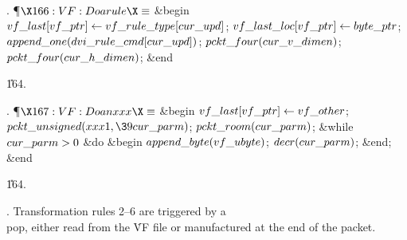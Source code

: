 . \P$\X166:VF: Do a \\{rule}\X\S$\6
\&{begin} $\\{vf\_last}[\\{vf\_ptr}]\gets\\{vf\_rule\_type}[\\{cur\_upd}]$;\5
$\\{vf\_last\_loc}[\\{vf\_ptr}]\gets\\{byte\_ptr}$;\5
$\\{append\_one}(\\{dvi\_rule\_cmd}[\\{cur\_upd}])$;\5
$\\{pckt\_four}(\\{cur\_v\_dimen})$;\5
$\\{pckt\_four}(\\{cur\_h\_dimen})$;\6
\&{end}\par
\U164.\fi

. \P$\X167:VF: Do an \\{xxx}\X\S$\6
\&{begin} $\\{vf\_last}[\\{vf\_ptr}]\gets\\{vf\_other}$;\5
$\\{pckt\_unsigned}(\\{xxx1},\39\\{cur\_parm})$;\5
$\\{pckt\_room}(\\{cur\_parm})$;\6
\&{while} $\\{cur\_parm}>0$ \1\&{do}\6
\&{begin} $\\{append\_byte}(\\{vf\_ubyte})$;\5
$\\{decr}(\\{cur\_parm})$;\6
\&{end};\2\6
\&{end}\par
\U164.\fi

. Transformation rules 2--6 are triggered by a \\{pop}, either read from
the \.{VF} file or manufactured at the end of the packet.

